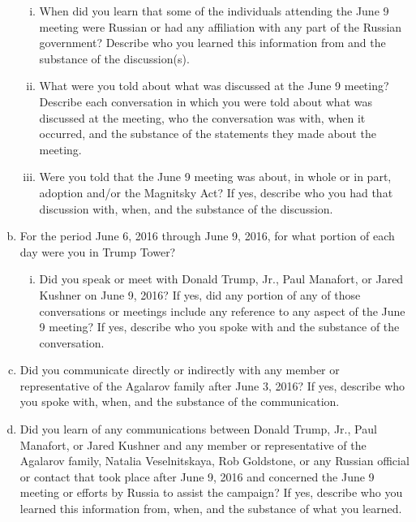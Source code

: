 \begin{enumerate}[a.]
\begin{enumerate}[i.]
\item When did you learn that some of the individuals attending the June 9 meeting were Russian or had any affiliation with any part of the Russian government?
Describe who you learned this information from and the substance of the discussion(s).

\item What were you told about what was discussed at the June 9 meeting?
Describe each conversation in which you were told about what was discussed at the meeting, who the conversation was with, when it occurred, and the substance of the statements they made about the meeting.

\item Were you told that the June 9 meeting was about, in whole or in part, adoption and/or the Magnitsky Act?
If yes, describe who you had that discussion with, when, and the substance of the discussion.

\end{enumerate}

\item For the period June 6, 2016 through June 9, 2016, for what portion of each day were you in Trump Tower?

\begin{enumerate}[i.]

\item Did you speak or meet with Donald Trump, Jr., Paul Manafort, or Jared Kushner on June 9, 2016?
If yes, did any portion of any of those conversations or meetings include any reference to any aspect of the June 9 meeting?
If yes, describe who you spoke with and the substance of the conversation.

\end{enumerate}

\item Did you communicate directly or indirectly with any member or representative of the Agalarov family after June 3, 2016?
If yes, describe who you spoke with, when, and the substance of the communication.

\item Did you learn of any communications between Donald Trump, Jr., Paul Manafort, or Jared Kushner and any member or representative of the Agalarov family, Natalia Veselnitskaya, Rob Goldstone, or any Russian official or contact that took place after June 9, 2016 and concerned the June 9 meeting or efforts by Russia to assist the campaign?
If yes, describe who you learned this information from, when, and the substance of what you learned.


\end{enumerate}
